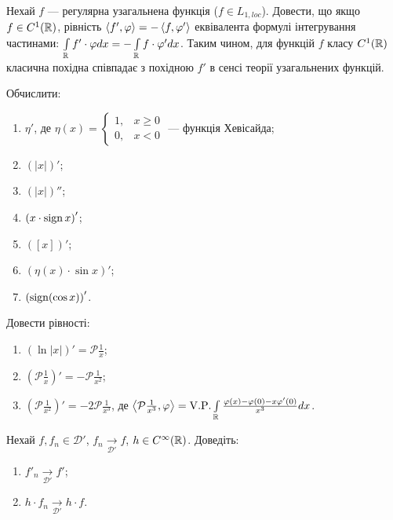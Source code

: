 \begin{exercise}
    Нехай $f$ --- регулярна узагальнена функція ($f \in L_{1, loc}$). Довести, що якщо
    $f \in C^1(\mathbb{R})$, рівність $\left\langle f', \varphi\right\rangle = -\left\langle f, \varphi'\right\rangle$ еквівалента
    формулі інтегрування частинами: $\int\limits_{\mathbb{R}}^{} f' \cdot \varphi dx = - \int\limits_{\mathbb{R}}^{} f\cdot \varphi' dx$.
    Таким чином, для функцій $f$ класу $C^1(\mathbb{R})$ класична похідна співпадає з похідною $f'$ в сенсі
    теорії узагальнених функцій.
\end{exercise}
\begin{exercise}
    Обчислити:
    \begin{enumerate}
        \item $\eta'$, де $\eta(x) = \begin{cases}
            1, & x \geq 0 \\
            0, & x < 0 
        \end{cases}$ --- функція Хевісайда;
        \item $\left( |x| \right)'$;
        \item $\left( |x| \right)''$;
        \item $\left( x\cdot \operatorname{sign} x\right)'$;
        \item $\left( [x] \right)'$;
        \item $\left(\eta(x) \cdot \sin x \right)'$;
        \item $\left(\operatorname{sign}(\cos x)\right)'$.
    \end{enumerate}
\end{exercise}
\begin{exercise}
    Довести рівності:
    \begin{enumerate}
        \item $\left( \ln |x|\right)' = \mathcal{P}\frac{1}{x}$;
        \item $\left(\mathcal{P}\frac{1}{x}\right)' = -\mathcal{P}\frac{1}{x^2}$;
        \item $\left(\mathcal{P}\frac{1}{x^2}\right)' = -2\mathcal{P}\frac{1}{x^3}$,
        де $\left\langle\mathcal{P}\frac{1}{x^3}, \varphi\right\rangle = \mathrm{V.P.}\int\limits_{\mathbb{R}}^{} \frac{\varphi(x) - \varphi(0) - x \varphi'(0)}{x^3} dx$.
    \end{enumerate}
\end{exercise}
\begin{exercise}
    Нехай $f, f_n \in \mathcal{D}'$, $f_n \underset{\mathcal{D}'}{\to} f$, $h \in C^{\infty}(\mathbb{R})$. Доведіть:
    \begin{enumerate}
        \item $f'_n \underset{\mathcal{D}'}{\to} f'$;
        \item $h\cdot f_n \underset{\mathcal{D}'}{\to} h\cdot f$.
    \end{enumerate}
\end{exercise}
